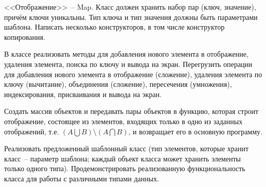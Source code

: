 
<<Отображение>>~-- Map. Класс должен хранить набор пар (ключ, значение), причём ключи
уникальны. Тип ключа и тип значения должны быть параметрами шаблона. Написать
несколько конструкторов, в том числе конструктор копирования.

В классе реализовать
методы для добавления нового элемента в отображение, удаления элемента, поиска по
ключу и вывода на экран. Перегрузить операции для добавления нового элемента в
отображение (сложение), удаления элемента по ключу (вычитание), объединения
(сложение), пересечения (умножения), индексирования, присваивания и вывода на экран.

Создать массив объектов и передавать пары объектов в функцию, которая строит
отображение, состоящее из элементов, входящих только в одно из заданных отображений,
т.е. $(A\bigcup B) \setminus (A\bigcap B)$, и возвращает его в основную программу.

Реализовать предложенный шаблонный класс (тип элементов, которые
хранит класс~-- параметр шаблона; каждый объект класса может хранить
элементы только одного типа). Продемонстрировать реализованную
функциональность класса для работы с различными типами данных.
